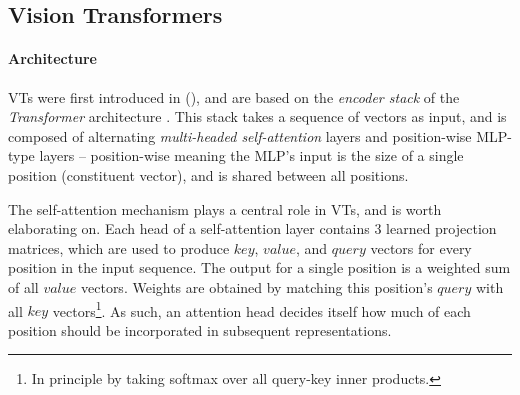

\subsection{Vision Transformers} \label{vits}
\paragraph{Architecture}
VTs were first introduced in \citeauthor{dosovitskiy2020image} (\citeyear{dosovitskiy2020image}), and are based on the \textit{encoder stack} of the \textit{Transformer} architecture \citep{vaswani2017attention}. This stack takes a sequence of vectors as input, and is composed of alternating \textit{multi-headed self-attention} layers and position-wise MLP-type layers -- position-wise meaning the MLP's input is the size of a single position (constituent vector), and is shared between all positions.

The self-attention mechanism plays a central role in VTs, and is worth elaborating on. Each head of a self-attention layer contains 3 learned projection matrices, which are used to produce $key$, $value$, and $query$ vectors for every position in the input sequence. The output for a single position is a weighted sum of all $value$ vectors. Weights are obtained by matching this position's $query$ with all $key$ vectors\footnote{In principle by taking softmax over all query-key inner products.}. As such, an attention head decides itself how much of each position should be incorporated in subsequent representations.

